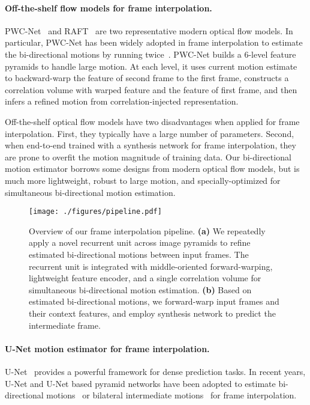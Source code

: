 \documentclass[10pt,twocolumn,letterpaper]{article}
\begin{document}
\paragraph{Off-the-shelf flow models for frame interpolation.}
PWC-Net~\cite{sun2018pwc} and RAFT~\cite{teed2020raft} are two representative
modern optical flow models. In particular, PWC-Net has been widely adopted in
frame interpolation to estimate the bi-directional motions by running
twice~\cite{bao2019depth,niklaus2018context,niklaus2020softmax}.  PWC-Net builds
a 6-level feature pyramids to handle large motion. At each level, it uses
current motion estimate to backward-warp the feature of second frame to the
first frame, constructs a correlation volume with warped feature and the feature
of first frame, and then infers a refined motion from correlation-injected
representation.


Off-the-shelf optical flow models have two disadvantages when applied for frame
interpolation. First, they typically have a large number of parameters.  Second,
when end-to-end trained with a synthesis network for frame interpolation, they
are prone to overfit the motion magnitude of training data.  Our bi-directional
motion estimator borrows some designs from modern optical flow models, but is
much more lightweight, robust to large motion, and specially-optimized for
simultaneous bi-directional motion estimation.


\begin{figure*}[!htb]
\centering
\texttt{[image: ./figures/pipeline.pdf]}
\caption{
    Overview of our frame interpolation pipeline. \textbf{(a)} We repeatedly
    apply a novel recurrent unit across image pyramids to refine estimated
    bi-directional motions between input frames. The recurrent unit is
    integrated with middle-oriented forward-warping, lightweight feature
    encoder, and a single correlation volume for simultaneous bi-directional
    motion estimation. \textbf{(b)} Based on estimated bi-directional motions,
    we forward-warp input frames and their context features, and employ
    synthesis network to predict the intermediate frame.
}
\label{fig:pipeline}
\end{figure*}



\paragraph{U-Net motion estimator for frame interpolation.}
U-Net~\cite{ronneberger2015u} provides a powerful framework for dense prediction
tasks. In recent years, U-Net and U-Net based pyramid networks have been adopted
to estimate bi-directional motions~\cite{jiang2018super,sim2021xvfi} or
bilateral intermediate motions~\cite{zhang2020flexible,huang2020rife} for frame
interpolation.
\end{document}
